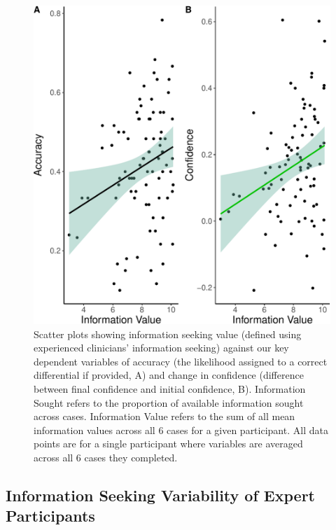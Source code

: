 \documentclass[a4paper, nobind]{templates/ociamthesis}
\begin{document}
\begin{figure}[H]

{\centering \includegraphics[width=1\linewidth]{_main_files/figure-latex/confAccPlotExp-1} 

}

\caption[Online Study Appendix: Expert Information Seeking against Confidnece/Accuracy (Scatter Plots)]{Scatter plots showing information seeking value (defined using experienced clinicians' information seeking) against our key dependent variables of accuracy (the likelihood assigned to a correct differential if provided, A) and change in confidence (difference between final confidence and initial confidence, B). Information Sought refers to the proportion of available information sought across cases. Information Value refers to the sum of all mean information values across all 6 cases for a given participant. All data points are for a single participant where variables are averaged across all 6 cases they completed.}\label{fig:confAccPlotExp}
\end{figure}

\subsection{Information Seeking Variability of Expert Participants}\label{information-seeking-variability-of-expert-participants}
\end{document}
